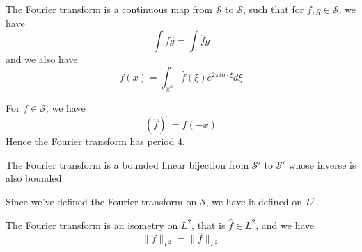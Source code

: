 \documentclass[lang=en,10pt, color=none]{elegantbook}
\newcommand{\R}{\mathbb{R}}
\begin{document}
\begin{theorem}
    The Fourier transform is a continuous map from $\mathcal{S}$ to $\mathcal{S}$, such that for $f,g\in\mathcal{S}$, we have
    \begin{equation*}
        \int f\hat{g}=\int \hat{f}g
    \end{equation*}
    and we also have
    \begin{equation*}
        f(x)=\int_{\R^n}\hat{f}(\xi)e^{2\pi in\cdot\xi}d\xi
    \end{equation*}
\end{theorem}
\begin{comment}
    Note just like for a lot of things, we can assume $x=0$ for the Fourier inversion formula. And that translation by $x$ is just $e^{2\pi in\cdot\xi}$ in the Fourier space.
\end{comment}
\begin{corollary}
    For $f\in\mathcal{S}$, we have
    \begin{equation*}
        (\hat{f})^{\widehat{\phantom{.}}}=f(-x)
    \end{equation*}
    Hence the Fourier transform has period 4.
\end{corollary}

\begin{theorem}
    The Fourier transform is a bounded linear bijection from $\mathcal{S}'$ to $\mathcal{S}'$ whose inverse is also bounded.
\end{theorem}
\begin{comment}
    Recall we define the Fourier transform on $\mathcal{S}'$ by 
    \begin{equation*}
        \hat{T}(f)=T(\hat{f})
    \end{equation*}
\end{comment}

Since we've defined the Fourier transform on $\mathcal{S}$, we have it defined on $L^p$.
\begin{theorem}[Plancherel]
    The Fourier transform is an isometry on $L^2$, that is $\hat{f}\in L^2$, and we have
    \begin{equation*}
        \|f\|_{L^2}=\|\hat{f}\|_{L^2}
    \end{equation*}
\end{theorem}
\begin{comment}
    Note that we proved this using the duality formula in Theorem 1.7 by setting $\oveline{f}=\hat{g}$ for some $g$, and have $g=\overline{\hat{f}}$.
\end{comment}
\end{document}
